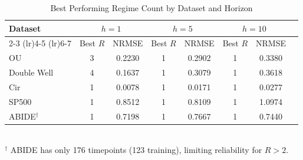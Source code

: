 \begin{table}[h!]
\centering
\caption{Best Performing Regime Count by Dataset and Horizon}
\label{tab:regime-best}
\begin{tabular}{lccccccc}
\toprule
Dataset & \multicolumn{2}{c}{$h=1$} & \multicolumn{2}{c}{$h=5$} & \multicolumn{2}{c}{$h=10$} \\
\cmidrule(lr){2-3} \cmidrule(lr){4-5} \cmidrule(lr){6-7}
 & Best $R$ & NRMSE & Best $R$ & NRMSE & Best $R$ & NRMSE \\
\midrule
OU & 3 & 0.2230 & 1 & 0.2902 & 1 & 0.3380 \\
Double Well & 4 & 0.1637 & 1 & 0.3079 & 1 & 0.3618 \\
Cir & 1 & 0.0078 & 1 & 0.0171 & 1 & 0.0277 \\
SP500 & 1 & 0.8512 & 1 & 0.8109 & 1 & 1.0974 \\
ABIDE$^\dagger$ & 1 & 0.7198 & 1 & 0.7667 & 1 & 0.7440 \\
\bottomrule
\end{tabular}
\vspace{0.1cm}\\
\footnotesize{$^\dagger$ ABIDE has only 176 timepoints (123 training), limiting reliability for $R>2$.}
\end{table}